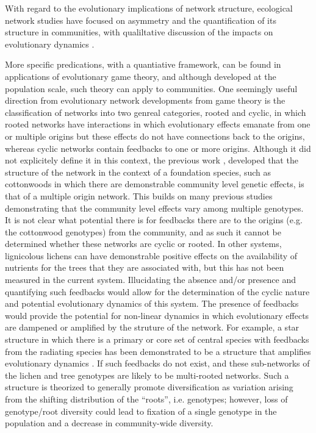 \documentclass[11pt,twocolumn,twoside,lineno]{pnas-new}
\begin{document}
With regard to the evolutionary implications of network structure,
ecological network studies have focused on asymmetry and the
quantification of its structure in communities, with qualiltative
discussion of the impacts on evolutionary dynamics \cite{Bascompte,
  Guimareas, Fortuna}. 

More specific predications, with a quantiative framework, can be found
in applications of evolutionary game theory, and although developed at
the population scale, such theory can apply to communities. One
seemingly useful direction from evolutionary network developments from
game theory is the classification of networks into two genreal
categories, rooted and cyclic, in which rooted networks have
interactions in which evolutionary effects emanate from one or
multiple origins but these effects do not have connections back to the
origins, whereas cyclic networks contain feedbacks to one or more
origins. Although it did not explicitely define it in this context,
the previous work \citep{Lau2017a}, developed that the structure of
the network in the context of a foundation species, such as
cottonwoods in which there are demonstrable community level genetic
effects, is that of a multiple origin network. This builds on many
previous studies demonstrating that the community level effects vary
among multiple genotypes. It is not clear what potential there is for
feedbacks there are to the origins (e.g. the cottonwood genotypes)
from the community, and as such it cannot be determined whether these
networks are cyclic or rooted. In other systems, lignicolous lichens
can have demonstrable positive effects on the availability of
nutrients for the trees that they are associated with, but this has
not been measured in the current system. Illucidating the absence
and/or presence and quantifying such feedbacks would allow for the
determination of the cyclic nature and potential evolutionary dynamics
of this system. The presence of feedbacks would provide the potential
for non-linear dynamics in which evolutionary effects are dampened or
amplified by the struture of the network. For example, a star
structure in which there is a primary or core set of central species
with feedbacks from the radiating species has been demonstrated to be
a structure that amplifies evolutionary dynamics
\cite{Lieberman2005}. If such feedbacks do not exist, and these
sub-networks of the lichen and tree genotypes are likely to be
multi-rooted networks. Such a structure is theorized to generally
promote diversification as variation arising from the shifting
distribution of the ``roots'', i.e. genotypes; however, loss of
genotype/root diversity could lead to fixation of a single genotype in
the population and a decrease in community-wide diversity.
\end{document}
